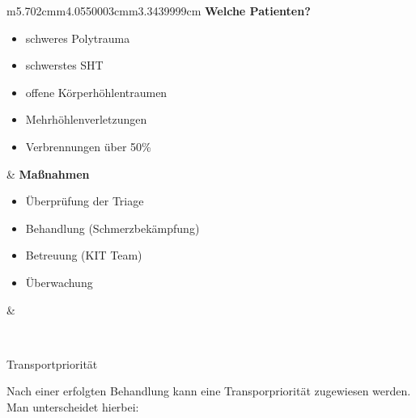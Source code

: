 \documentclass{article}
\newcommand\gEs[1]{\textbf{\textcolor[rgb]{0.0,0.0,0.5019608}{#1}}}
\newcommand\gEs[1]{\textbf{\textcolor[rgb]{0.0,0.0,0.5019608}{#1}}}
\begin{document}
\begin{center}
\tablehead{}\begin{supertabular}{m{5.702cm}m{4.0550003cm}m{3.3439999cm}}
{\mdseries \gEs{Welche Patienten?}}

\begin{itemize}
\item {\mdseries schweres Polytrauma}

\item {\mdseries schwerstes SHT}

\item {\mdseries offene K\"orperh\"ohlentraumen}

\item {\mdseries Mehrh\"ohlenverletzungen}

\item {\mdseries Verbrennungen \"uber 50\%}

\end{itemize}
 &
{\mdseries \gEs{Ma{\ss}nahmen}}

\begin{itemize}
\item {\mdseries \"Uberpr\"ufung der Triage}

\item {\mdseries Behandlung  (Schmerzbek\"ampfung)}

\item {\mdseries Betreuung (KIT Team)}

\item {\mdseries \"Uberwachung}

\end{itemize}
 &
{%
 \par}

\\
\end{supertabular}
\end{center}
{\mdseries\color{black}
Transportpriorit\"at}

{\mdseries
Nach einer erfolgten Behandlung kann eine Transporpriorit\"at zugewiesen
werden. Man unterscheidet hierbei: }
\end{document}
